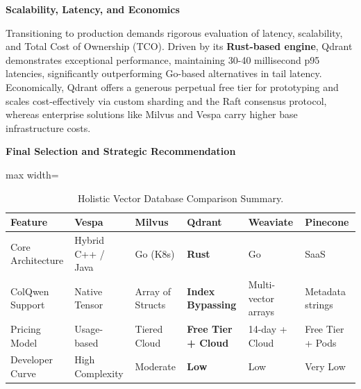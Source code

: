 \textbf{Scalability, Latency, and Economics}

Transitioning to production demands rigorous evaluation of latency, scalability, and Total Cost of Ownership (TCO). Driven by its \textbf{Rust-based engine}, Qdrant demonstrates exceptional performance, maintaining 30-40 millisecond p95 latencies, significantly outperforming Go-based alternatives in tail latency. Economically, Qdrant offers a generous perpetual free tier for prototyping and scales cost-effectively via custom sharding and the Raft consensus protocol, whereas enterprise solutions like Milvus and Vespa carry higher base infrastructure costs.

\begin{table}[H]
    \centering
    \caption{Cloud Scalability, Latency, and Economic Efficiency.}
    \label{tab:scalability_econ}
\end{table}

\textbf{Final Selection and Strategic Recommendation}

\begin{table}[H]
    \centering
    \caption{Holistic Vector Database Comparison Summary.}
    \label{tab:holistic_db_comp}
    \begin{adjustbox}{max width=\linewidth}
    \begin{tabular}{llllll}
        \toprule
        \textbf{Feature} & \textbf{Vespa} & \textbf{Milvus} & \textbf{Qdrant} & \textbf{Weaviate} & \textbf{Pinecone} \\
        \midrule
        Core Architecture & Hybrid C++ / Java & Go (K8s) & \textbf{Rust} & Go & SaaS \\
        ColQwen Support & Native Tensor & Array of Structs & \textbf{Index Bypassing} & Multi-vector arrays & Metadata strings \\
        Pricing Model & Usage-based & Tiered Cloud & \textbf{Free Tier + Cloud} & 14-day + Cloud & Free Tier + Pods \\
        Developer Curve & High Complexity & Moderate & \textbf{Low} & Low & Very Low \\
        \bottomrule
    \end{tabular}
\end{adjustbox}
\end{table}

